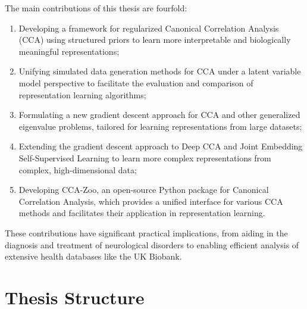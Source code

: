 The main contributions of this thesis are fourfold:
\begin{enumerate}
\item Developing a framework for regularized Canonical Correlation Analysis (CCA) using structured priors to learn more interpretable and biologically meaningful representations;
\item Unifying simulated data generation methods for CCA under a latent variable model perspective to facilitate the evaluation and comparison of representation learning algorithms;
\item Formulating a new gradient descent approach for CCA and other generalized eigenvalue problems, tailored for learning representations from large datasets;
\item Extending the gradient descent approach to Deep CCA and Joint Embedding Self-Supervised Learning to learn more complex representations from complex, high-dimensional data;
\item Developing CCA-Zoo, an open-source Python package for Canonical Correlation Analysis, which provides a unified interface for various CCA methods and facilitates their application in representation learning.
\end{enumerate}
These contributions have significant practical implications, from aiding in the diagnosis and treatment of neurological disorders to enabling efficient analysis of extensive health databases like the UK Biobank.

\section{Thesis Structure}

